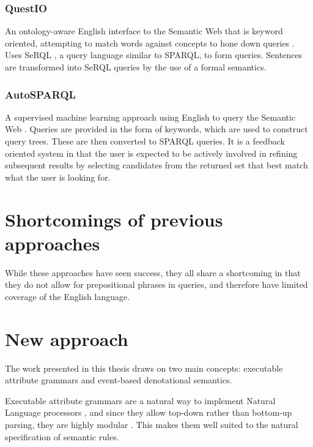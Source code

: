 \documentclass[../main.tex]{subfiles}
\begin{document}
\subsubsection{QuestIO}
An ontology-aware English interface to the Semantic Web that is keyword oriented, attempting to match words against concepts to hone down queries\cite{tablan2008natural} .  Uses SeRQL \cite{serql}, a query language similar to SPARQL, to form queries.  Sentences are transformed into SeRQL queries by the use of a formal semantics.

\subsubsection{AutoSPARQL}
A supervised machine learning approach using English to query the Semantic Web \cite{lehmann2011autosparql}.  Queries are provided in the form of keywords, which are used to construct query trees.  These are then converted to SPARQL queries.  It is a feedback oriented system in that the user is expected to be actively involved in refining subsequent results by selecting candidates from the returned set that best match what the user is looking for.


\section {Shortcomings of previous approaches}

While these approaches have seen success, they all share a shortcoming in that they do not allow for prepositional phrases in queries, and therefore have limited coverage of the English language.

\section {New approach}

The work presented in this thesis draws on two main concepts: executable attribute grammars\cite{frosthafiz2008} and event-based denotational semantics\cite{frostagboola2014}.

Executable attribute grammars are a natural way to implement Natural Language processors \cite{?}, and since they allow top-down rather than bottom-up parsing, they are highly modular \cite{frosthafiz2008}.  This makes them well suited to the natural specification of semantic rules.
\end{document}
